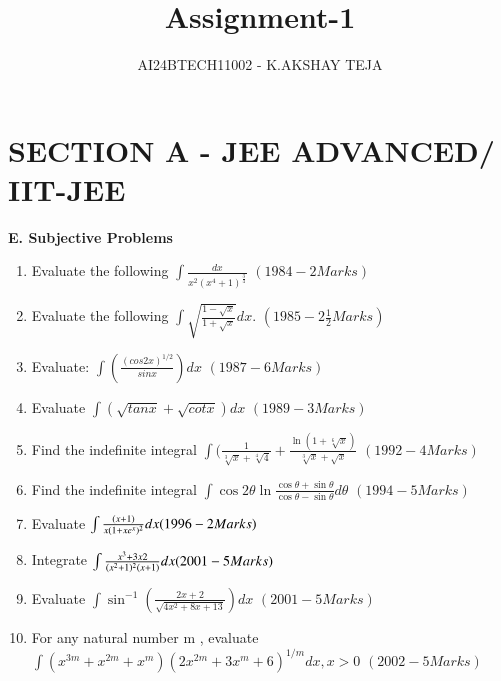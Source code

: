 \documentclass[journal,12pt,twocolumn]{IEEEtran}
\theoremstyle{remark}
\begin{document}

\vspace{3cm}

\title{Assignment-1}
\author{AI24BTECH11002 - K.AKSHAY TEJA}
\maketitle
\newpage
\bigskip

\renewcommand{\thefigure}{\theenumi}
\renewcommand{\thetable}{\theenumi}
\large\large\section{\textbf{SECTION A - JEE ADVANCED/ IIT-JEE}}\small\small

\textbf{E. Subjective Problems}
 \begin{enumerate}
    
\item   Evaluate the following $\int\frac{dx}{x^2(x^4 +1)^\frac{3}{4}} $ 
            {$(1984 - 2 Marks)$}  
\item   Evaluate the following $\int \sqrt{\frac{1 - \sqrt{x}}{1 + \sqrt{x}}}   dx$.
  {$(1985 - 2\frac{1}{2} Marks)$}  


\item Evaluate: $\int {(\frac{(cos2x)^{1/2}}{sin x})}dx$ \hfill  {$(1987 - 6 Marks)$} \\

\item   Evaluate {$\int(\sqrt{tan x}+\sqrt{cot x})dx$}      
  {
$(1989 - 3 Marks)$ }
 

\item  Find the indefinite integral $\int$$(\frac{1}{\sqrt[3]{x} + \sqrt[4]{4}}+\frac{\ln (1+\sqrt[6]{x})}{\sqrt[3]{x}+\sqrt{x}}$     {$(1992 - 4 Marks)$} 

\item Find the indefinite integral \(\int \cos 2\theta \ln \frac{\cos \theta + \sin \theta}{\cos \theta - \sin \theta}   d\theta\) \hfill  {$(1994 - 5 Marks)$}


\item  Evaluate $\int\frac{(x + 1)}{x(1 + xe^x)^2}dx  \hfill{ {(1996 - 2 Marks)}}$\\

\item Integrate $\int\frac{x^{3}+3x 2}{(x^{2}+ 1)^{2}(x + 1)}dx \hfill   {(2001 - 5 Marks)}$\\

\item   Evaluate $\int \sin^{-1} (\frac{2x + 2}{\sqrt{4x^{2}+8x+13}})dx$        {${(2001 - 5 Marks)}$}  

\item  For any natural number m , evaluate \\
${\int(x^{3m} + x^{2m}+x^{m})(2x^{2m}+3x^{m}+6)^{1/m}dx,x>0}$       {$(2002 - 5 Marks)$} 
 
\end{enumerate}
\end{document}
